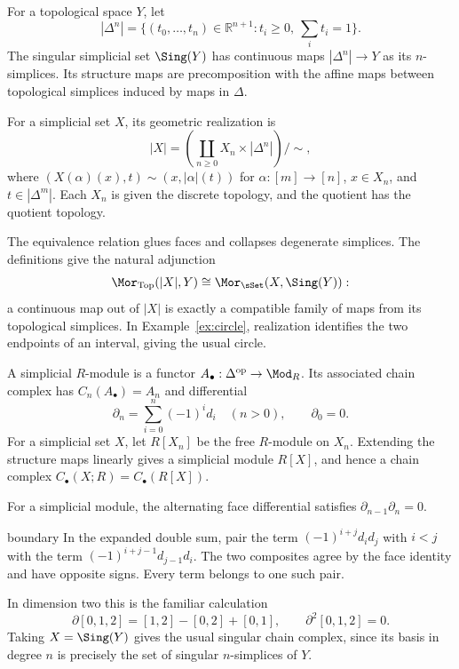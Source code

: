 \documentclass[11pt]{article}
\begin{document}
\begin{definition}\label{def:sing}
For a topological space $Y$, let
\[
|\Delta^n|=\{(t_0,\ldots,t_n)\in\mathbb R^{n+1}:t_i\geq0,\ \textstyle\sum_i t_i=1\}.
\]
The singular simplicial set $\Sing(Y)$ has continuous maps $|\Delta^n|\to Y$ as its $n$-simplices. Its structure maps are precomposition with the affine maps between topological simplices induced by maps in $\Delta$.

For a simplicial set $X$, its geometric realization is
\[
|X|=\left(\coprod_{n\geq0}X_n\times|\Delta^n|\right)\big/\sim,
\]
where $(X(\alpha)(x),t)\sim(x,|\alpha|(t))$ for $\alpha:[m]\to[n]$, $x\in X_n$, and $t\in|\Delta^m|$. Each $X_n$ is given the discrete topology, and the quotient has the quotient topology.
\end{definition}
The equivalence relation glues faces and collapses degenerate simplices. The definitions give the natural adjunction
\[
\Mor_{\mathrm{Top}}(|X|,Y)\cong\Mor_{\sSet}(X,\Sing(Y)):
\]
a continuous map out of $|X|$ is exactly a compatible family of maps from its topological simplices. In Example~\ref{ex:circle}, realization identifies the two endpoints of an interval, giving the usual circle.

\begin{definition}\label{def:chains}
A simplicial $R$-module is a functor $A_\bullet:\Delta^{\mathrm{op}}\to\Mod_R$. Its associated chain complex has $C_n(A_\bullet)=A_n$ and differential
\[
\partial_n=\sum_{i=0}^n(-1)^i d_i\quad(n>0),\qquad \partial_0=0.
\]
For a simplicial set $X$, let $R[X_n]$ be the free $R$-module on $X_n$. Extending the structure maps linearly gives a simplicial module $R[X]$, and hence a chain complex $C_\bullet(X;R)=C_\bullet(R[X])$.
\end{definition}

\begin{proposition}\label{prop:boundary}
For a simplicial module, the alternating face differential satisfies $\partial_{n-1}\partial_n=0$.
\end{proposition}
\begin{linkedproof}{boundary}
In the expanded double sum, pair the term $(-1)^{i+j}d_i d_j$ with $i<j$ with the term $(-1)^{i+j-1}d_{j-1}d_i$. The two composites agree by the face identity and have opposite signs. Every term belongs to one such pair.
\end{linkedproof}
In dimension two this is the familiar calculation
\[
\partial[0,1,2]=[1,2]-[0,2]+[0,1],\qquad
\partial^2[0,1,2]=0.
\]
Taking $X=\Sing(Y)$ gives the usual singular chain complex, since its basis in degree $n$ is precisely the set of singular $n$-simplices of $Y$.
\end{document}
